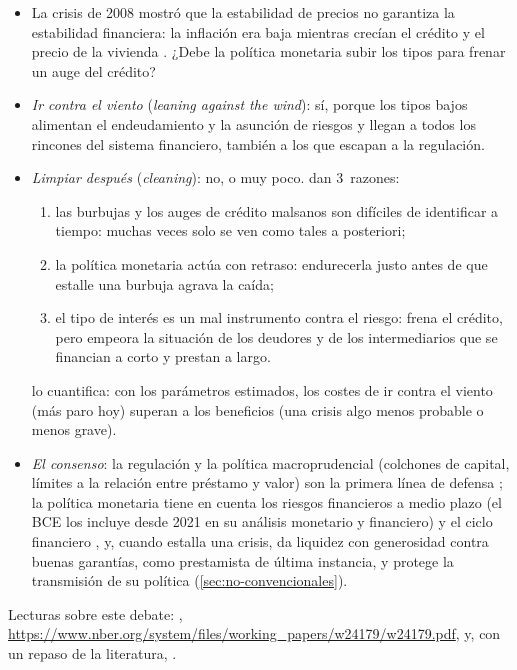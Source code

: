\documentclass[11pt]{article}
\begin{document}
\begin{itemize}
\item La crisis de 2008 mostró que la estabilidad de precios no garantiza la estabilidad financiera: la inflación era baja mientras crecían el crédito y el precio de la vivienda . ¿Debe la política monetaria subir los tipos para frenar un auge del crédito?
\item \emph{Ir contra el viento} (\emph{leaning against the wind}): sí, porque los tipos bajos alimentan el endeudamiento y la asunción de riesgos y llegan a todos los rincones del sistema financiero, también a los que escapan a la regulación\nocite{Stein2013Overheating}.
\item \emph{Limpiar después} (\emph{cleaning}): no, o muy poco. \textcite{BlanchardSummers2017Rethinking} dan 3~razones:
  \begin{enumerate}
  \item las burbujas y los auges de crédito malsanos son difíciles de identificar a tiempo: muchas veces solo se ven como tales a posteriori;
  \item la política monetaria actúa con retraso: endurecerla justo antes de que estalle una burbuja agrava la caída;
  \item el tipo de interés es un mal instrumento contra el riesgo: frena el crédito, pero empeora la situación de los deudores y de los intermediarios que se financian a corto y prestan a largo.
  \end{enumerate}
  \textcite{Svensson2017Cost} lo cuantifica: con los parámetros estimados, los costes de ir contra el viento (más paro hoy) superan a los beneficios (una crisis algo menos probable o menos grave).
\item \emph{El consenso}: la regulación y la política macroprudencial (colchones de capital, límites a la relación entre préstamo y valor) son la primera línea de defensa ; la política monetaria tiene en cuenta los riesgos financieros a medio plazo (el BCE los incluye desde 2021 en su análisis monetario y financiero\nocite{BCE2021Estrategia}) y el ciclo financiero , y, cuando estalla una crisis, da liquidez con generosidad contra buenas garantías, como prestamista de última instancia, y protege la transmisión de su política (\ref{sec:no-convencionales}).
\end{itemize}

\begin{anotaciones}
Lecturas sobre este debate: \textcite[24 y ss.]{BlanchardSummers2017Rethinking}, \url{https://www.nber.org/system/files/working_papers/w24179/w24179.pdf}, y, con un repaso de la literatura, \textcite{NairAnand2020}.
\end{anotaciones}
\end{document}
